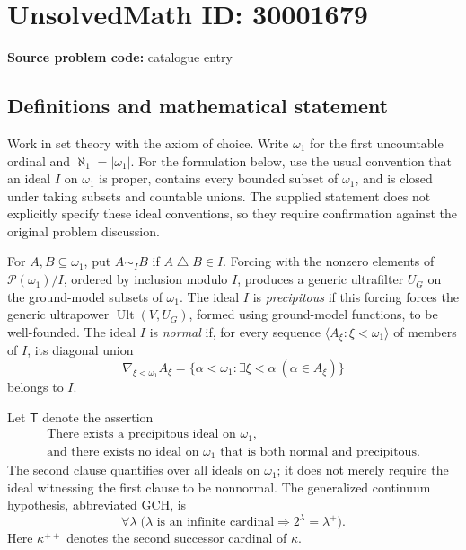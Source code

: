 \documentclass[11pt]{article}
\begin{document}
\section*{UnsolvedMath ID: 30001679}
\textbf{Source problem code:} catalogue entry
\subsection{Definitions and mathematical statement}
Work in set theory with the axiom of choice. Write \(\omega_1\) for the first uncountable ordinal and \(\aleph_1=|\omega_1|\). For the formulation below, use the usual convention that an ideal \(I\) on \(\omega_1\) is proper, contains every bounded subset of \(\omega_1\), and is closed under taking subsets and countable unions. The supplied statement does not explicitly specify these ideal conventions, so they require confirmation against the original problem discussion.

For \(A,B\subseteq\omega_1\), put \(A\sim_I B\) if \(A\mathbin{\triangle}B\in I\). Forcing with the nonzero elements of \(\mathcal P(\omega_1)/I\), ordered by inclusion modulo \(I\), produces a generic ultrafilter \(U_G\) on the ground-model subsets of \(\omega_1\). The ideal \(I\) is \emph{precipitous} if this forcing forces the generic ultrapower \(\operatorname{Ult}(V,U_G)\), formed using ground-model functions, to be well-founded. The ideal \(I\) is \emph{normal} if, for every sequence \(\langle A_\xi:\xi<\omega_1\rangle\) of members of \(I\), its diagonal union
\[
\nabla_{\xi<\omega_1}A_\xi
=\{\alpha<\omega_1:\exists\xi<\alpha\ (\alpha\in A_\xi)\}
\]
belongs to \(I\).

Let \(\mathsf T\) denote the assertion
\[
\begin{gathered}
\text{There exists a precipitous ideal on }\omega_1,\\
\text{and there exists no ideal on }\omega_1
\text{ that is both normal and precipitous.}
\end{gathered}
\]
The second clause quantifies over all ideals on \(\omega_1\); it does not merely require the ideal witnessing the first clause to be nonnormal. The generalized continuum hypothesis, abbreviated GCH, is
\[
\forall\lambda\;\bigl(\lambda\text{ is an infinite cardinal}
\Longrightarrow 2^\lambda=\lambda^+\bigr).
\]
Here \(\kappa^{++}\) denotes the second successor cardinal of \(\kappa\).
\end{document}
